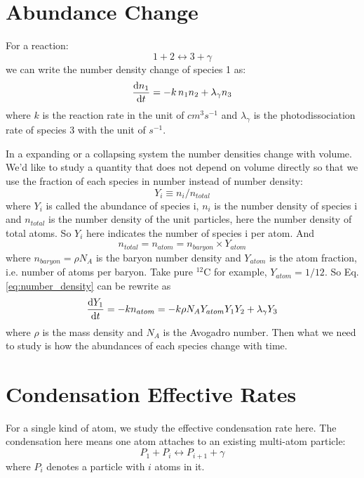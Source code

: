 \documentclass{article}
\begin{document}
\section{Abundance Change}

For a reaction:
\[
1 + 2 \longleftrightarrow 3 + \gamma
\]
we can write the number density change of species 1 as:
\begin{equation}
\frac{{\rm d}n_1}{{\rm d}t} = 
  -k \, n_1 n_2 + \lambda_\gamma n_3
\label{eq:number_density}
\end{equation}
where $k$ is the reaction rate in the unit of $cm^3s^{-1}$ and 
$\lambda_\gamma$ is the photodissociation rate of species 3 with the unit of
$s^{-1}$.

In a expanding or a collapsing system the number densities change with volume. 
We'd like to study a quantity that does not depend on volume directly so that
we use the fraction of each species in number instead of number density:
\[
Y_i \equiv n_i / n_{total}
\]
where $Y_i$ is called the abundance of species i, $n_i$ is the number density
of species i and $n_{total}$ is the number density of the unit particles, here
the number density of total atoms. So $Y_i$ here indicates the number
of species i per atom. And
\[
n_{total} = n_{atom} = n_{baryon} \times Y_{atom} 
\]
where $n_{baryon} = \rho N_A$ is the baryon number density and $Y_{atom}$ is
the atom fraction, i.e. number of atoms per baryon. Take pure $^{12}$C for 
example, $Y_{atom} = 1 / 12$. So Eq.\ref{eq:number_density} can be rewrite as
\begin{equation}
\frac{{\rm d}Y_1}{{\rm d}t} = 
  -k n_{atom} =
  -k \rho N_A Y_{atom} Y_1 Y_2 + \lambda_\gamma Y_3
\label{eq:abundance}
\end{equation}
where $\rho$ is the mass density and $N_A$ is the Avogadro number. Then what
we need to study is how the abundances of each species change with time.

\section{Condensation Effective Rates}

For a single kind of atom, we study the effective condensation rate here.
The condensation here means one atom attaches to an existing multi-atom
particle:
\begin{equation}
P_1 + P_i \longleftrightarrow P_{i+1} + \gamma
\label{eq:reaction}
\end{equation} 
where $P_i$ denotes a particle with $i$ atoms in it.
\end{document}
